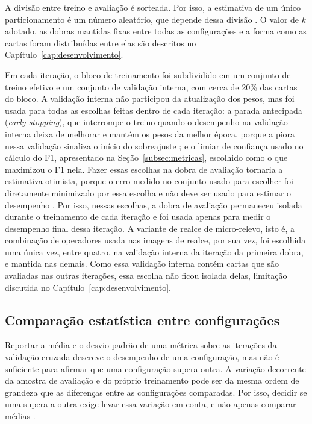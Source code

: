\documentclass[
    12pt,                %
    openright,           %
    oneside,             %
    a4paper,             %
    english,             %
    brazil               %
]{abntex2}
\begin{document}
A divisão entre treino e avaliação é sorteada. Por isso, a estimativa de
um único particionamento é um número aleatório, que depende dessa divisão
\cite{Kohavi1995}. O valor de
$k$ adotado, as dobras mantidas fixas entre todas as configurações e
a forma como as cartas foram distribuídas entre elas são descritos no
Capítulo~\ref{cap:desenvolvimento}.

Em cada iteração, o bloco de treinamento foi subdividido em um conjunto
de treino efetivo e um conjunto de validação interna, com cerca de
20\% das cartas do bloco. A validação interna não participou da
atualização dos pesos, mas foi usada para todas as escolhas feitas
dentro de cada iteração: a parada antecipada
(\textit{early stopping}), que interrompe o treino quando o
desempenho na validação interna deixa de melhorar e mantém os pesos
da melhor época, porque a piora nessa validação sinaliza o início do
sobreajuste \cite{Prechelt1998}; e o limiar de confiança usado no cálculo do F1,
apresentado na Seção~\ref{subsec:metricas}, escolhido como o que
maximizou o F1 nela. Fazer essas escolhas na dobra de avaliação tornaria
a estimativa otimista, porque o erro medido no conjunto usado para
escolher foi diretamente minimizado por essa escolha e não deve ser
usado para estimar o desempenho \cite{Cawley2010}. Por isso, nessas
escolhas, a dobra de avaliação permaneceu isolada durante o
treinamento de cada iteração e foi usada apenas para medir o desempenho
final dessa iteração. A variante de realce de micro-relevo, isto é, a
combinação de operadores usada nas imagens de realce, por sua vez,
foi escolhida uma única vez, entre quatro, na validação interna da
iteração da primeira dobra, e mantida nas demais. Como essa validação interna
contém cartas que são avaliadas nas outras iterações, essa escolha não
ficou isolada delas, limitação discutida no
Capítulo~\ref{cap:desenvolvimento}.

\subsection{Comparação estatística entre configurações}
\label{subsec:comparacao_estatistica}

Reportar a média e o desvio padrão de uma métrica sobre as iterações da
validação cruzada descreve o desempenho de uma configuração, mas não é
suficiente para afirmar que uma configuração supera outra. A variação
decorrente da amostra de avaliação e do próprio treinamento pode ser da
mesma ordem de grandeza que as diferenças entre as configurações
comparadas. Por isso, decidir se uma supera a outra exige levar essa
variação em conta, e não apenas comparar médias \cite{Bouthillier2021}.
\end{document}
